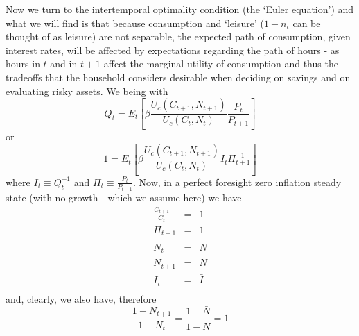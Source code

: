 \documentclass[authoryear,11pt]{elsarticle}
\begin{document}
Now we turn to the intertemporal optimality condition (the `Euler equation') and what we will find is that because consumption and `leisure' ($1-n_{t}$ can be thought of as leisure) are not separable, the expected path of consumption, given interest rates, will be affected by expectations regarding the path of hours - as hours in $t$ and in $t+1$ affect the marginal utility of consumption and thus the tradeoffs that the household considers desirable when deciding on savings and on evaluating risky assets. We being with
\[
Q_{t} = E_{t}\left[ \beta \frac{U_{c}(C_{t+1},N_{t+1})}{U_{c}(C_{t},N_{t})} \frac{P_{t}}{P_{t+1}} \right]
\]
or
\begin{equation}
1 = E_{t}\left[ \beta \frac{U_{c}(C_{t+1},N_{t+1})}{U_{c}(C_{t},N_{t})} I_{t} \Pi_{t+1}^{-1} \right]	\label{eqn:euler}
\end{equation}
where $I_{t}\equiv Q_{t}^{-1}$ and $\Pi_{t}\equiv \frac{P_{t}}{P_{t-1}}$. Now, in a perfect foresight zero inflation steady state (with no growth - which we assume here) we have
\begin{eqnarray}
\frac{C_{t+1}}{C_{t}}	&=& 1			\\
\Pi_{t+1}				&=& 1			\\
N_{t}					&=& \bar{N}		\\
N_{t+1}					&=& \bar{N}		\\
I_{t}					&=& \bar{I}	\\
\end{eqnarray}
and, clearly, we also have, therefore
\[
\frac{1-N_{t+1}}{1-N_{t}} = \frac{1-\bar{N}}{1-\bar{N}} = 1
\]
\end{document}
